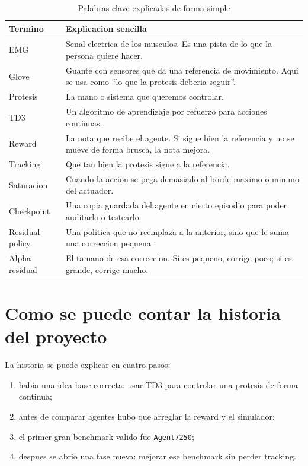 \documentclass[11pt,a4paper]{article}
\begin{document}
\begin{table}[H]
\centering
\caption{Palabras clave explicadas de forma simple}
\small
\begin{tabularx}{\linewidth}{@{}L{3.2cm}Y@{}}
\toprule
Termino & Explicacion sencilla \\
\midrule
EMG & Senal electrica de los musculos. Es una pista de lo que la persona quiere hacer. \\
Glove & Guante con sensores que da una referencia de movimiento. Aqui se usa como ``lo que la protesis deberia seguir''. \\
Protesis & La mano o sistema que queremos controlar. \\
TD3 & Un algoritmo de aprendizaje por refuerzo para acciones continuas \citep{fujimoto2018td3}. \\
Reward & La nota que recibe el agente. Si sigue bien la referencia y no se mueve de forma brusca, la nota mejora. \\
Tracking & Que tan bien la protesis sigue a la referencia. \\
Saturacion & Cuando la accion se pega demasiado al borde maximo o minimo del actuador. \\
Checkpoint & Una copia guardada del agente en cierto episodio para poder auditarlo o testearlo. \\
Residual policy & Una politica que no reemplaza a la anterior, sino que le suma una correccion pequena \citep{silver2018residual,schaff2020shared,resfit2025}. \\
Alpha residual & El tamano de esa correccion. Si es pequeno, corrige poco; si es grande, corrige mucho. \\
\bottomrule
\end{tabularx}
\end{table}

\section{Como se puede contar la historia del proyecto}

La historia se puede explicar en cuatro pasos:
\begin{enumerate}[leftmargin=1.5em]
\item habia una idea base correcta: usar TD3 para controlar una protesis de forma continua;
\item antes de comparar agentes hubo que arreglar la reward y el simulador;
\item el primer gran benchmark valido fue \texttt{Agent7250};
\item despues se abrio una fase nueva: mejorar ese benchmark sin perder tracking.
\end{enumerate}
\end{document}
